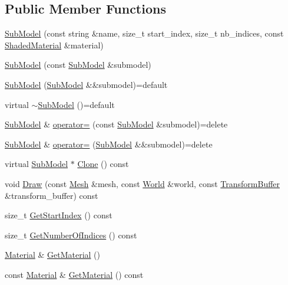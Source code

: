 \subsection*{Public Member Functions}
\begin{DoxyCompactItemize}
\item 
\hyperlink{classmage_1_1_sub_model_a26dce7b076af1edb4209d0a236a250ef}{Sub\+Model} (const string \&name, size\+\_\+t start\+\_\+index, size\+\_\+t nb\+\_\+indices, const \hyperlink{structmage_1_1_shaded_material}{Shaded\+Material} \&material)
\item 
\hyperlink{classmage_1_1_sub_model_ae71dcb72fc1b06710b390c97a2db1d68}{Sub\+Model} (const \hyperlink{classmage_1_1_sub_model}{Sub\+Model} \&submodel)
\item 
\hyperlink{classmage_1_1_sub_model_a6b4b972e0740af607113aae0418e370e}{Sub\+Model} (\hyperlink{classmage_1_1_sub_model}{Sub\+Model} \&\&submodel)=default
\item 
virtual \hyperlink{classmage_1_1_sub_model_a75853fd4a6435f074f13eab9c73b695b}{$\sim$\+Sub\+Model} ()=default
\item 
\hyperlink{classmage_1_1_sub_model}{Sub\+Model} \& \hyperlink{classmage_1_1_sub_model_aafc8b4ba509ec78ea36719e98b1a0c99}{operator=} (const \hyperlink{classmage_1_1_sub_model}{Sub\+Model} \&submodel)=delete
\item 
\hyperlink{classmage_1_1_sub_model}{Sub\+Model} \& \hyperlink{classmage_1_1_sub_model_a616b8007e767deebc248485fb8d26773}{operator=} (\hyperlink{classmage_1_1_sub_model}{Sub\+Model} \&\&submodel)=delete
\item 
virtual \hyperlink{classmage_1_1_sub_model}{Sub\+Model} $\ast$ \hyperlink{classmage_1_1_sub_model_a368bcc2ee819cc29ec0203e314ae91d3}{Clone} () const
\item 
void \hyperlink{classmage_1_1_sub_model_a16400e2d0cc14a38fba18971e227d2ee}{Draw} (const \hyperlink{classmage_1_1_mesh}{Mesh} \&mesh, const \hyperlink{classmage_1_1_world}{World} \&world, const \hyperlink{structmage_1_1_transform_buffer}{Transform\+Buffer} \&transform\+\_\+buffer) const
\item 
size\+\_\+t \hyperlink{classmage_1_1_sub_model_a2b901cb62dca26a7ff399719e0a4ba66}{Get\+Start\+Index} () const
\item 
size\+\_\+t \hyperlink{classmage_1_1_sub_model_a18736678fc1a5d882776298053e037b3}{Get\+Number\+Of\+Indices} () const
\item 
\hyperlink{structmage_1_1_material}{Material} \& \hyperlink{classmage_1_1_sub_model_a8487b28be21ae182cd97c61325b2b478}{Get\+Material} ()
\item 
const \hyperlink{structmage_1_1_material}{Material} \& \hyperlink{classmage_1_1_sub_model_ab9e1c661e94a2ac0d819ad5d36a18a4c}{Get\+Material} () const
\end{DoxyCompactItemize}
